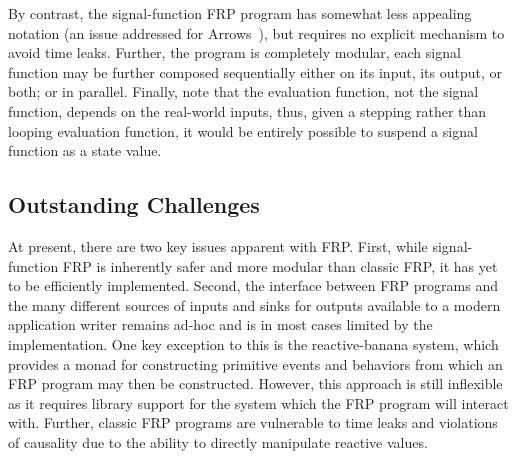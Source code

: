 By contrast, the signal-function FRP program has somewhat less appealing notation (an issue addressed for Arrows~\cite{Paterson2001}), 
but requires no explicit mechanism to avoid time leaks. Further, the program is completely modular, each signal function may be further
composed sequentially either on its input, its output, or both; or in parallel. Finally, note that the evaluation function, not the signal
function, depends on the real-world inputs, thus, given a stepping rather than looping evaluation function, it would be entirely possible
to suspend a signal function as a state value.


\subsection{Outstanding Challenges}
\label{subsection:outstanding_challenges}

At present, there are two key issues apparent with FRP. First, while signal-function FRP is inherently safer and more modular than classic FRP, it has yet to be
efficiently implemented. Second, the interface between FRP programs and the many different sources of inputs and sinks for outputs available to a modern application
writer remains ad-hoc and is in most cases limited by the implementation. One key exception to this is the reactive-banana system, which provides a monad for
constructing primitive events and behaviors from which an FRP program may then be constructed. However, this approach is still inflexible as it requires library support
for the system which the FRP program will interact with. Further, classic FRP programs are vulnerable to time leaks and violations of causality due to the ability
to directly manipulate reactive values.
